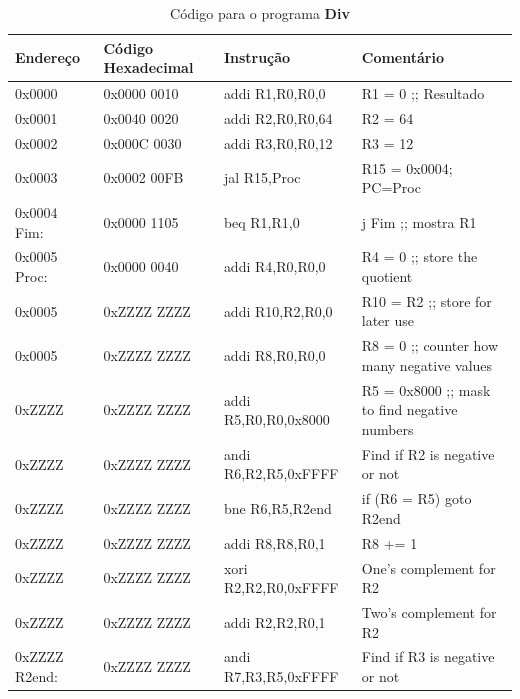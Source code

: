 \documentclass[12pt]{article}
\begin{document}
\begin{table}[H]
    \centering
    \caption{Código para o programa \textbf{Div}}
    \begin{tabular}{|l|l|l|l|}\hline
        \textbf{Endereço} & \textbf{Código Hexadecimal} & \textbf{Instrução} & \textbf{Comentário} \\\hline
        0x0000         & 0x0000 0010 & addi R1,R0,R0,0      & R1 = 0 ;; Resultado                           \\\hline
        0x0001         & 0x0040 0020 & addi R2,R0,R0,64     & R2 = 64                                       \\\hline
        0x0002         & 0x000C 0030 & addi R3,R0,R0,12     & R3 = 12                                       \\\hline
        0x0003         & 0x0002 00FB & jal  R15,Proc        & R15 = 0x0004; PC=Proc                         \\\hline
        0x0004 Fim:    & 0x0000 1105 & beq  R1,R1,0         & j Fim ;; mostra R1                            \\\hline
        0x0005 Proc:   & 0x0000 0040 & addi R4,R0,R0,0      & R4 = 0 ;; store the quotient                  \\\hline
        0x0005         & 0xZZZZ ZZZZ & addi R10,R2,R0,0     & R10 = R2 ;; store for later use               \\\hline
        0x0005         & 0xZZZZ ZZZZ & addi R8,R0,R0,0      & R8 = 0 ;; counter how many negative values    \\\hline
        0xZZZZ         & 0xZZZZ ZZZZ & addi R5,R0,R0,0x8000 & R5 = 0x8000 ;; mask to find negative numbers  \\\hline
        0xZZZZ         & 0xZZZZ ZZZZ & andi R6,R2,R5,0xFFFF & Find if R2 is negative or not                 \\\hline
        0xZZZZ         & 0xZZZZ ZZZZ & bne  R6,R5,R2end     & if (R6 \!= R5) goto R2end                     \\\hline
        0xZZZZ         & 0xZZZZ ZZZZ & addi R8,R8,R0,1      & R8 += 1                                       \\\hline
        0xZZZZ         & 0xZZZZ ZZZZ & xori R2,R2,R0,0xFFFF & One's complement for R2                       \\\hline
        0xZZZZ         & 0xZZZZ ZZZZ & addi R2,R2,R0,1      & Two's complement for R2                       \\\hline
        0xZZZZ R2end:  & 0xZZZZ ZZZZ & andi R7,R3,R5,0xFFFF & Find if R3 is negative or not                 \\\hline

\end{tabular}
\end{table}
\end{document}
